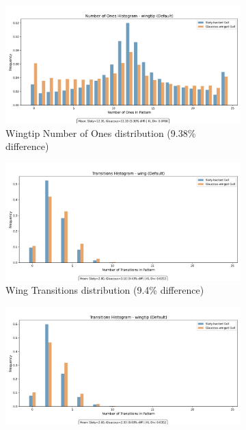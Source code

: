 \documentclass[a4paper,12pt]{report}
\begin{document}
\begin{figure}[H]
    \centering
    \begin{subfigure}[b]{0.49\textwidth}
        \includegraphics[width=\textwidth]{images/LBP/default_wingtip_ones_histogram.png}
        \caption{Wingtip Number of Ones distribution (9.38\% difference)}
        \label{fig:wingtip_ones}
    \end{subfigure}
    \hfill
    \begin{subfigure}[b]{0.49\textwidth}
        \includegraphics[width=\textwidth]{images/LBP/default_wing_transitions_histogram.png}
        \caption{Wing Transitions distribution (9.4\% difference)}
        \label{fig:wing_transitions}
    \end{subfigure}
    \vspace{2mm}
    \begin{subfigure}[b]{0.49\textwidth}
        \includegraphics[width=\textwidth]{images/LBP/default_wingtip_transitions_histogram.png}

\end{subfigure}
\end{figure}
\end{document}

